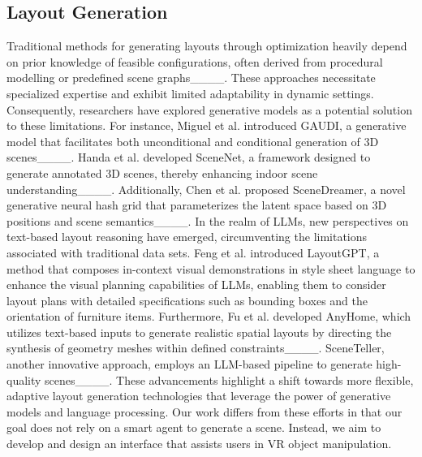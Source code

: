 \subsection{Layout Generation}
Traditional methods for generating layouts through optimization heavily depend on prior knowledge of feasible configurations, often derived from procedural modelling or predefined scene graphs____. These approaches necessitate specialized expertise and exhibit limited adaptability in dynamic settings. Consequently, researchers have explored generative models as a potential solution to these limitations. For instance, Miguel et al. introduced GAUDI, a generative model that facilitates both unconditional and conditional generation of 3D scenes____. Handa et al. developed SceneNet, a framework designed to generate annotated 3D scenes, thereby enhancing indoor scene understanding____. Additionally, Chen et al. proposed SceneDreamer, a novel generative neural hash grid that parameterizes the latent space based on 3D positions and scene semantics____. In the realm of LLMs, new perspectives on text-based layout reasoning have emerged, circumventing the limitations associated with traditional data sets. Feng et al. introduced LayoutGPT, a method that composes in-context visual demonstrations in style sheet language to enhance the visual planning capabilities of LLMs, enabling them to consider layout plans with detailed specifications such as bounding boxes and the orientation of furniture items. Furthermore, Fu et al. developed AnyHome, which utilizes text-based inputs to generate realistic spatial layouts by directing the synthesis of geometry meshes within defined constraints____. SceneTeller, another innovative approach, employs an LLM-based pipeline to generate high-quality scenes____. These advancements highlight a shift towards more flexible, adaptive layout generation technologies that leverage the power of generative models and language processing.
Our work differs from these efforts in that our goal does not rely on a smart agent to generate a scene. Instead, we aim to develop and design an interface that assists users in VR object manipulation.